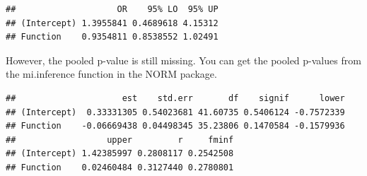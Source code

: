 \documentclass[]{book}
\newenvironment{Shaded}{\begin{snugshade}}{\end{snugshade}}
\newcommand{\KeywordTok}[1]{\textcolor[rgb]{0.13,0.29,0.53}{\textbf{#1}}}
\newcommand{\DataTypeTok}[1]{\textcolor[rgb]{0.13,0.29,0.53}{#1}}
\newcommand{\DecValTok}[1]{\textcolor[rgb]{0.00,0.00,0.81}{#1}}
\newcommand{\StringTok}[1]{\textcolor[rgb]{0.31,0.60,0.02}{#1}}
\newcommand{\ControlFlowTok}[1]{\textcolor[rgb]{0.13,0.29,0.53}{\textbf{#1}}}
\newcommand{\OperatorTok}[1]{\textcolor[rgb]{0.81,0.36,0.00}{\textbf{#1}}}
\newcommand{\NormalTok}[1]{#1}
\theoremstyle{definition}
\theoremstyle{definition}
\theoremstyle{definition}
\theoremstyle{remark}
\begin{document}
\begin{Shaded}
\end{Shaded}

\begin{verbatim}
##                    OR    95% LO  95% UP
## (Intercept) 1.3955841 0.4689618 4.15312
## Function    0.9354811 0.8538552 1.02491
\end{verbatim}

However, the pooled p-value is still missing. You can get the pooled
p-values from the mi.inference function in the NORM package.

\begin{Shaded}
\end{Shaded}

\begin{verbatim}
##                     est    std.err       df    signif      lower
## (Intercept)  0.33331305 0.54023681 41.60735 0.5406124 -0.7572339
## Function    -0.06669438 0.04498345 35.23806 0.1470584 -0.1579936
##                  upper         r     fminf
## (Intercept) 1.42385997 0.2808117 0.2542508
## Function    0.02460484 0.3127440 0.2780801
\end{verbatim}
\end{document}
